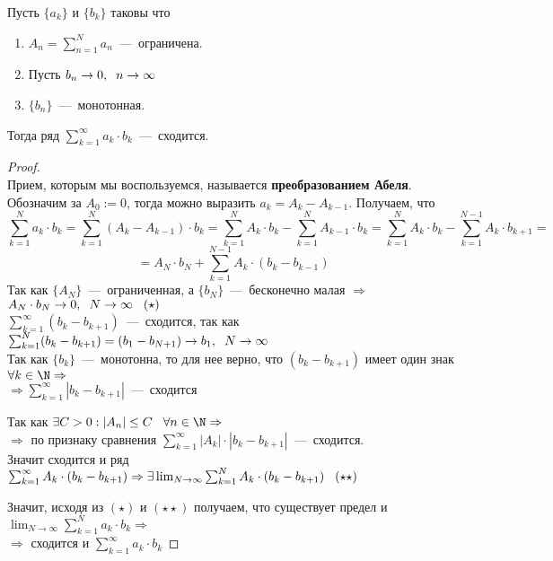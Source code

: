 \begin{theorem}
    \text{}
    
    Пусть $\{a_k\}$ и $\{b_k\}$ таковы что 
    \begin{enumerate}
        \item $A_n = \sum_{n = 1}^{N} a_n$~---~ограничена.
        \item Пусть $b_n \rightarrow 0, \hspace{0.2cm} n \rightarrow \infty$
        \item $\{b_n\}$~---~монотонная.
    \end{enumerate}
    Тогда ряд $\sum_{k=1}^{\infty}a_k\cdot b_k$~---~сходится.
\end{theorem}
\begin{proof}
    \text{}\\
    Прием, которым мы воспользуемся, называется \textbf{преобразованием Абеля}. \\ Обозначим за $A_0 := 0$, тогда можно выразить $a_k = A_k - A_{k - 1}$. Получаем, что 
    \[\sum_{k=1}^{N}a_k\cdot b_k = \sum_{k = 1}^{N} (A_k - A_{k - 1}) \cdot b_k = \sum_{k = 1}^{N}A_k \cdot b_k - \sum_{k = 1}^{N} A_{k - 1} \cdot b_k = \sum_{k = 1}^{N}A_k \cdot b_k - \sum_{k = 1}^{N - 1} A_k \cdot b_{k + 1} = \]
    \[= A_N \cdot b_N + \sum_{k = 1}^{N - 1} A_k \cdot (b_k - b_{k - 1})\]
    Так как $\{A_N\}$~---~ограниченная, а $\{b_N\}$~---~бесконечно малая $\Rightarrow$ $A_N \cdot b_N\rightarrow 0, \hspace{0.2cm} N \rightarrow \infty \hspace{0.3cm} (\star)$ \\ 
    $\sum_{k = 1}^{\infty} (b_k - b_{k + 1})$~---~сходится, так как $\sum_{k = 1}^{N}(b_k - b_{k+1}) = (b_1 - b_{N + 1}) \rightarrow b_1, \hspace{0.2cm} N \rightarrow \infty$ \\
    Так как $\{ b_k \}$~---~монотонна, то для нее верно, что $(b_{k} - b_{k + 1})$ имеет один знак $\forall k \in \N \Rightarrow$ \\
    $\Rightarrow \sum_{k = 1}^{\infty} |b_k - b_{k + 1}|$~---~сходится
    
    Так как $\exists C > 0: |A_n| \leq C \hspace{0.3cm} \forall n \in \N \Rightarrow$ \\ 
    $\Rightarrow$ по признаку сравнения $\sum_{k = 1}^{\infty} |A_k| \cdot |b_k - b_{k + 1}|$~---~сходится.\\
    Значит сходится и ряд $\sum_{k = 1}^{\infty}A_k\cdot (b_k - b_{k + 1}) \Rightarrow \exists \lim_{N\rightarrow\infty}{\sum_{k = 1}^{N}{A_k \cdot (b_k - b_{k + 1})}} \hspace{0.3cm} (\star \star)$ 

    Значит, исходя из $(\star)$ и $(\star \star)$ получаем, что существует предел и $\lim_{N\rightarrow\infty} \sum_{k = 1}^{N} a_k \cdot b_k \Rightarrow$\\
    $\Rightarrow$ сходится и $\sum_{k = 1}^{\infty} a_k \cdot b_k$
\end{proof}

